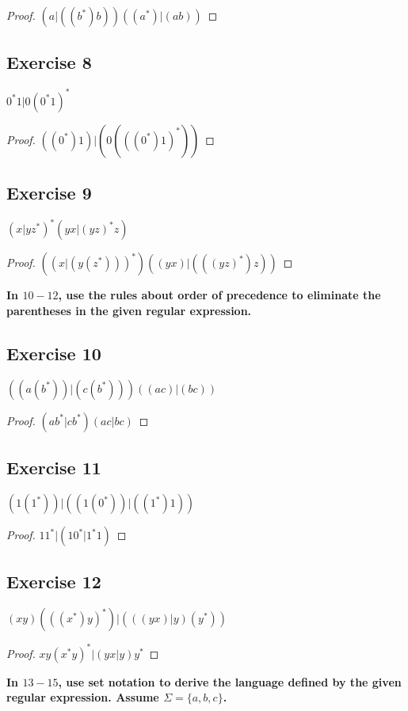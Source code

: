 \documentclass[14pt]{extarticle}
\newcommand{\cy}{\color{cyan}}
\begin{document}
\begin{proof}
    \((a | ((b^*)b))((a^*) | (ab))\)
\end{proof}

\subsection{Exercise 8}
\(0^*1 | 0(0^*1)^*\)

\begin{proof}
    \(((0^*)1) | (0(((0^*)1)^*))\)
\end{proof}

\subsection{Exercise 9}
\((x | yz^*)^*(yx | (yz)^*z)\)

\begin{proof}
    \(((x | (y(z^*)))^*) ((yx) | (((yz)^*)z))\)
\end{proof}

{\bf \cy In \(10-12\), use the rules about order of precedence to eliminate the parentheses in the given regular expression.}

\subsection{Exercise 10}
\(((a(b^*)) | (c(b^*))) ((ac) | (bc))\)

\begin{proof}
    \((ab^* | cb^*)(ac | bc)\)
\end{proof}

\subsection{Exercise 11}
\((1(1^*)) | ((1(0^*)) | ((1^*)1))\)

\begin{proof}
    \(11^* | (10^* | 1^*1)\)
\end{proof}

\subsection{Exercise 12}
\((xy)(((x^*)y)^*) | (((yx) | y)(y^*))\)

\begin{proof}
    \(xy(x^*y)^* | (yx | y)y^*\)
\end{proof}

{\bf In \(13-15\), use set notation to derive the language defined by the given regular expression.
Assume \(\Sigma = \{a, b, c\}\).}
\end{document}
